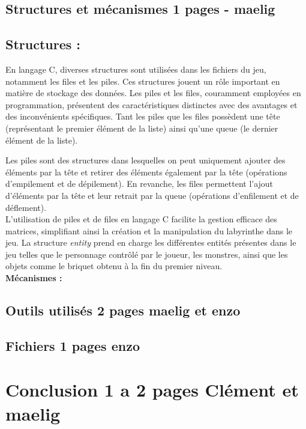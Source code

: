 \documentclass[10pt]{article}
\begin{document}
   \subsection{Structures et mécanismes 1 pages - maelig}
   \subsection{Structures :}

   En langage C, diverses structures sont utilisées dans les fichiers du jeu, notamment les files et les piles. 
   Ces structures jouent un rôle important en matière de stockage des données. Les piles et les files, couramment employées en programmation, 
   présentent des caractéristiques distinctes avec des avantages et des inconvénients spécifiques. Tant les piles que les files possèdent une tête 
   (représentant le premier élément de la liste) ainsi qu'une queue (le dernier élément de la liste).

   Les piles sont des structures dans lesquelles on peut uniquement ajouter des éléments par la tête et retirer des éléments également par la tête 
   (opérations d'empilement et de dépilement). En revanche, les files permettent l'ajout d'éléments par la tête et leur retrait par la queue 
   (opérations d'enfilement et de déflement).\\

   L'utilisation de piles et de files en langage C facilite la gestion efficace des matrices, simplifiant ainsi la création et la manipulation du 
   labyrinthe dans le jeu. La structure \textit{entity} prend en charge les différentes entités présentes dans le jeu telles que le personnage contrôlé 
   par le joueur, les monstres, ainsi que les objets comme le briquet obtenu à la fin du premier niveau.\\


   \textbf{Mécanismes :}\\
   \subsection{Outils utilisés 2 pages maelig et enzo}
   \subsection{Fichiers 1 pages enzo}
   
\section{Conclusion 1 a 2 pages Clément et maelig}
\end{document}
